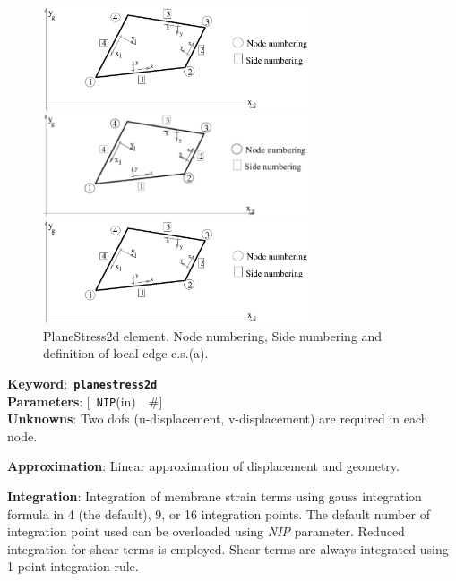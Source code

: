 \documentclass[a4paper]{article}
\newcommand{\descitem}[1]{{\noindent \bf #1}:}
\newcommand{\elemkeyword}[1]{\descitem{Keyword}~{\bf \texttt{#1}}}
\newcommand{\elemparam}[2]{{{\texttt{#1}\tiny (#2)}~~\#}}
\newcommand{\optelemparam}[2]{{[~\elemparam{#1}{#2}]}}
\newcommand{\param}[1]{{\em #1}}
\begin{document}
\begin{figure}[tb]
\begin{htmlonly}
  \centerline{\includegraphics[width=0.7\textwidth]{planestress2d.eps}}
\end{htmlonly}
\ifpdf
\centerline{\includegraphics[width=0.7\textwidth]{planestress2d.pdf}}
\else
\centerline{\includegraphics[width=0.7\textwidth]{planestress2d.eps}}
\fi
\caption{PlaneStress2d element. Node numbering, Side numbering and
definition of local edge c.s.(a).}
\label{Planestress2dfig}
\end{figure}

\elemkeyword{planestress2d}\\
\descitem{Parameters} \optelemparam{NIP}{in}\\
\descitem{Unknowns}
Two dofs (u-displacement, v-displacement) are required in each node.

\descitem{Approximation} Linear approximation of displacement and
geometry.

\descitem{Integration}
Integration of membrane strain terms using gauss integration formula
in 4 (the default), 9, or 16 integration points. The default number of
integration point used can be overloaded using \param{NIP} parameter.
Reduced integration for shear terms is employed. Shear terms are
always integrated using 1 point integration rule.
\end{document}
